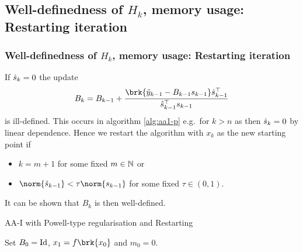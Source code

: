 
\subsection{Well-definedness of $H_k$, memory usage: Restarting iteration}
\begin{frame}
	\frametitle{Well-definedness of $H_k$, memory usage: Restarting iteration}
	If $\hat{s}_k=0$ the update
	\begin{align*}
		B_{k} = B_{k-1}+\frac{\brk{\tiy_{k-1}-B_{k-1}s_{k-1}}\hs_{k-1}^\top}{\hs_{k-1}^\top s_{k-1}}
	\end{align*}
	is ill-defined. This occurs in algorithm \ref{alg:aa1-p} e.g.\ for $k>n$ as then $\hat{s}_k=0$ by linear dependence.
	Hence we restart the algorithm with $x_k$ as the new starting point if
	\begin{itemize}
		\item $k=m+1$ for some fixed $m\in\mathbb{N}$ or
		\item $\norm{\hs_{k-1}}<\tau\norm{s_{k-1}}$ for some fixed $\tau\in(0,1)$.
	\end{itemize}
	It can be shown that $B_k$ is then well-defined.
\end{frame}

\begin{frame}
	\begin{algorithm}[H]
	\caption{AA-I with Powell-type regularisation and Restarting}\label{alg:aa1-pr}
	\color{gray}
	\BlankLine
	Set $B_0=\operatorname{Id}$, $x_1=f\brk{x_0}$ and {\black $m_0 = 0$}.
	
	\end{algorithm}
\end{frame}

